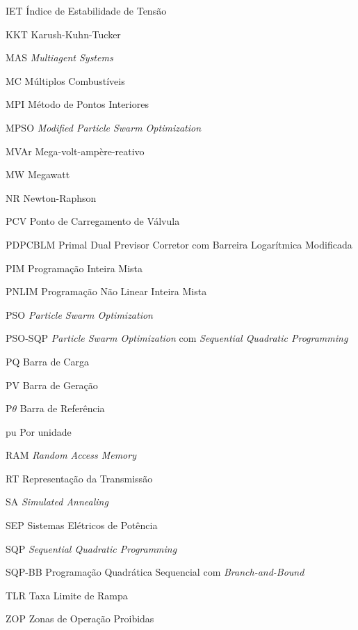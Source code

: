 \documentclass[
	12pt,				%
	openany,			%
	twoside,			%
	a4paper,			%
	chapter=TITLE,		%
	section=Title,		%
	subsection=Title,	%
	subsubsection=Title,%
	english,			%
	french,				%
	spanish,			%
	brazil			%
	]{abntex2}
\begin{document}
\begin{ERRATA}
\begin{siglas}
    \item[IET] Índice de Estabilidade de Tensão
    \item[KKT] Karush-Kuhn-Tucker
    \item[MAS] \emph{Multiagent Systems}
    \item[MC] Múltiplos Combustíveis
    \item[MPI] Método de Pontos Interiores
    \item [MPSO] \emph{Modified Particle Swarm Optimization}
    \item [MVAr] Mega-volt-ampère-reativo
    \item [MW] Megawatt
    \item[NR] Newton-Raphson
    \item[PCV] Ponto de Carregamento de Válvula
    \item[PDPCBLM] Primal Dual Previsor Corretor com Barreira Logarítmica Modificada
    \item[PIM] Programação Inteira Mista
    \item[PNLIM] Programação Não Linear Inteira Mista
    \item[PSO] \emph{Particle Swarm Optimization}
    \item[PSO-SQP] \emph{Particle Swarm Optimization} com \emph{Sequential Quadratic Programming}
    \item [PQ] Barra de Carga
    \item [PV] Barra de Geração
    \item [P$\theta$] Barra de Referência
    \item[pu] Por unidade
    \item[RAM] \emph{Random Access Memory}
    \item[RT] Representação da Transmissão
    \item[SA] \emph{Simulated Annealing}
    \item[SEP] Sistemas Elétricos de Potência
    \item[SQP] \emph{Sequential Quadratic Programming}
    \item[SQP-BB] Programação Quadrática Sequencial com \emph{Branch-and-Bound}
    \item[TLR] Taxa Limite de Rampa
    \item[ZOP] Zonas de Operação Proibidas

  
\end{siglas}

\tableofcontents*
\cleardoublepage




\end{ERRATA}
\end{document}
